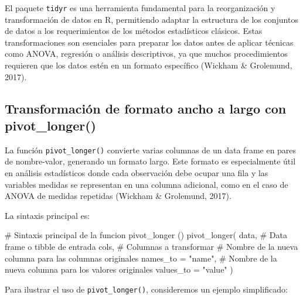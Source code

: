 \documentclass[
  spanish,
  a4paper,
  DIV=11,
  numbers=noendperiod,
  onepage,
  openany]{scrreprt}
\newenvironment{Shaded}{\begin{snugshade}}{\end{snugshade}}
\newcommand{\AttributeTok}[1]{\textcolor[rgb]{0.40,0.45,0.13}{#1}}
\newcommand{\CommentTok}[1]{\textcolor[rgb]{0.37,0.37,0.37}{#1}}
\newcommand{\FunctionTok}[1]{\textcolor[rgb]{0.28,0.35,0.67}{#1}}
\newcommand{\NormalTok}[1]{\textcolor[rgb]{0.00,0.23,0.31}{#1}}
\newcommand{\StringTok}[1]{\textcolor[rgb]{0.13,0.47,0.30}{#1}}
\begin{document}
El paquete \texttt{tidyr} es una herramienta fundamental para la
reorganización y transformación de datos en R, permitiendo adaptar la
estructura de los conjuntos de datos a los requerimientos de los métodos
estadísticos clásicos. Estas transformaciones son esenciales para
preparar los datos antes de aplicar técnicas como ANOVA, regresión o
análisis descriptivos, ya que muchos procedimientos requieren que los
datos estén en un formato específico (Wickham \& Grolemund, 2017).

\subsection{Transformación de formato ancho a largo con
pivot\_longer()}\label{transformaciuxf3n-de-formato-ancho-a-largo-con-pivot_longer}

La función \texttt{pivot\_longer()} convierte varias columnas de un data
frame en pares de nombre-valor, generando un formato largo. Este formato
es especialmente útil en análisis estadísticos donde cada observación
debe ocupar una fila y las variables medidas se representan en una
columna adicional, como en el caso de ANOVA de medidas repetidas
(Wickham \& Grolemund, 2017).

La sintaxis principal es:

\begin{Shaded}
\begin{Highlighting}[]
\CommentTok{\# Sintaxis principal de la funcion pivot\_longer ()}
\FunctionTok{pivot\_longer}\NormalTok{(}
\NormalTok{  data,              }\CommentTok{\# Data frame o tibble de entrada}
\NormalTok{  cols,              }\CommentTok{\# Columnas a transformar}
  \CommentTok{\# Nombre de la nueva columna para las columnas originales}
  \AttributeTok{names\_to =} \StringTok{"name"}\NormalTok{, }
  \CommentTok{\# Nombre de la nueva columna para los valores originales}
  \AttributeTok{values\_to =} \StringTok{"value"} 
\NormalTok{)}
\end{Highlighting}
\end{Shaded}

Para ilustrar el uso de \texttt{pivot\_longer()}, consideremos un
ejemplo simplificado:
\end{document}
